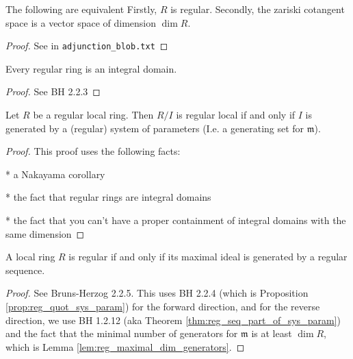 \begin{proposition}
  \label{prop:reg_def_equiv}
  The following are equivalent
  Firstly, $R$ is regular.
  Secondly, the zariski cotangent space
  is a vector space of dimension $\dim R$.
\end{proposition}

\begin{proof}
  See in \verb|adjunction_blob.txt|
\end{proof}

\begin{lemma}
  \label{lem:reg_int_dom}
  Every regular ring is an integral domain.
\end{lemma}

\begin{proof}

  See BH 2.2.3

\end{proof}

\begin{proposition}[BH 2.2.4]
  \label{prop:reg_quot_sys_param}
  Let $R$ be a regular local ring. 
  Then $R / I$ is regular local if and only if 
  $I$ is generated by a (regular) system of parameters
  (I.e. a generating set for $\mathfrak{m}$).
\end{proposition}

\begin{proof}
  This proof uses the following facts:

  * a Nakayama corollary
  
  * the fact that regular rings are integral domains

  * the fact that you can't have a proper containment
    of integral domains with the same dimension
\end{proof}

\begin{proposition}
  \label{prop:reg_loc_maximal_reg_seq}
  A local ring $R$ is regular if and only if
  its maximal ideal is generated by a regular sequence.
\end{proposition}

\begin{proof}
  See Bruns-Herzog 2.2.5. This uses BH 2.2.4 
  (which is Proposition \ref{prop:reg_quot_sys_param}) for the forward
  direction,
  and for the reverse direction, we use BH 1.2.12 
  (aka Theorem \ref{thm:reg_seq_part_of_sys_param}) 
  and the fact that
  the minimal number of generators for $\mathfrak{m}$ is at least
  $\dim R$, which is Lemma \ref{lem:reg_maximal_dim_generators}.
\end{proof}

